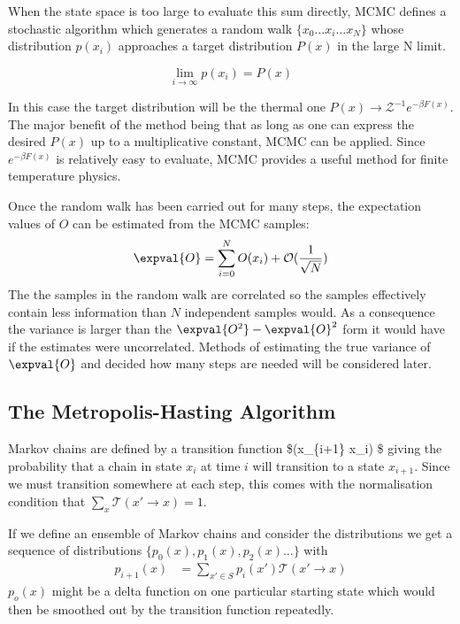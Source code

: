 When the state space is too large to evaluate this sum directly, MCMC defines a stochastic algorithm which generates a random walk \(\{x_0\ldots x_i\ldots x_N\}\) whose distribution \(p(x_i)\) approaches a target distribution \(P(x)\) in the large N limit.

\[\lim_{i\to\infty} p(x_i) = P(x)\]

In this case the target distribution will be the thermal one \(P(x) \rightarrow \mathcal{Z}^{-1} e^{-\beta F(x)}\). The major benefit of the method being that as long as one can express the desired \(P(x)\) up to a multiplicative constant, MCMC can be applied. Since \(e^{-\beta F(x)}\) is relatively easy to evaluate, MCMC provides a useful method for finite temperature physics.

Once the random walk has been carried out for many steps, the expectation values of \(O\) can be estimated from the MCMC samples: \[
    \expval{O} = \sum_{i = 0}^{N} O(x_i) + \mathcal{O}(\frac{1}{\sqrt{N}})
\] The the samples in the random walk are correlated so the samples effectively contain less information than \(N\) independent samples would. As a consequence the variance is larger than the \(\expval{O^2} - \expval{O}^2\) form it would have if the estimates were uncorrelated. Methods of estimating the true variance of \(\expval{O}\) and decided how many steps are needed will be considered later.

\hypertarget{the-metropolis-hasting-algorithm}{%
\subsection{The Metropolis-Hasting Algorithm}\label{the-metropolis-hasting-algorithm}}

Markov chains are defined by a transition function \$(x\_\{i+1\} \rightarrow x\_i) \$ giving the probability that a chain in state \(x_i\) at time \(i\) will transition to a state \(x_{i+1}\). Since we must transition somewhere at each step, this comes with the normalisation condition that \(\sum\limits_x \mathcal{T}(x' \rightarrow x) = 1\).

If we define an ensemble of Markov chains and consider the distributions we get a sequence of distributions \(\{p_0(x), p_1(x), p_2(x)\ldots\}\) with \[\begin{aligned}
p_{i+1}(x) &= \sum_{x' \in S} p_i(x') \mathcal{T}(x' \rightarrow x)
\end{aligned}\] \(p_o(x)\) might be a delta function on one particular starting state which would then be smoothed out by the transition function repeatedly.

